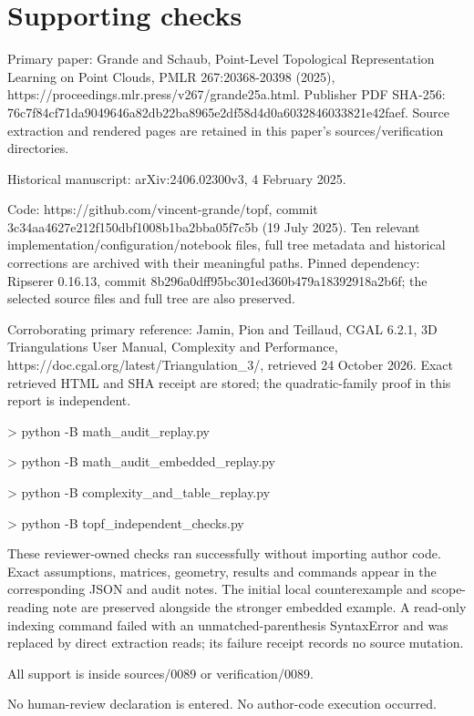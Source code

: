 \documentclass[10pt]{article}
\begin{document}
\section*{Supporting checks}
Primary paper: Grande and Schaub, Point-Level Topological Representation Learning on Point Clouds, PMLR 267:20368-20398 (2025), https://proceedings.mlr.press/v267/grande25a.html. Publisher PDF SHA-256: 76c7f84cf71da9049646a82db22ba8965e2df58d4d0a6032846033821e42faef. Source extraction and rendered pages are retained in this paper’s sources/verification directories.\par
Historical manuscript: arXiv:2406.02300v3, 4 February 2025.\par
Code: https://github.com/vincent-grande/topf, commit 3c34aa4627e212f150dbf1008b1ba2bba05f7c5b (19 July 2025). Ten relevant implementation/configuration/notebook files, full tree metadata and historical corrections are archived with their meaningful paths. Pinned dependency: Ripserer 0.16.13, commit 8b296a0dff95bc301ed360b479a18392918a2b6f; the selected source files and full tree are also preserved.\par
Corroborating primary reference: Jamin, Pion and Teillaud, CGAL 6.2.1, 3D Triangulations User Manual, Complexity and Performance, https://doc.cgal.org/latest/Triangulation\_3/, retrieved 24 October 2026. Exact retrieved HTML and SHA receipt are stored; the quadratic-family proof in this report is independent.\par
> python -B math\_audit\_replay.py\par
> python -B math\_audit\_embedded\_replay.py\par
> python -B complexity\_and\_table\_replay.py\par
> python -B topf\_independent\_checks.py\par
These reviewer-owned checks ran successfully without importing author code. Exact assumptions, matrices, geometry, results and commands appear in the corresponding JSON and audit notes. The initial local counterexample and scope-reading note are preserved alongside the stronger embedded example. A read-only indexing command failed with an unmatched-parenthesis SyntaxError and was replaced by direct extraction reads; its failure receipt records no source mutation.\par
All support is inside sources/0089 or verification/0089.\par
No human-review declaration is entered. No author-code execution occurred.\par
\end{document}
